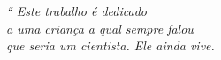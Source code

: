 \begin{epigrafe}
	\vspace*{\fill}
	\begin{flushright}
		\textit{``
		Este trabalho é dedicado 
		\\ a uma criança a qual sempre falou 
		\\ que seria um cientista. Ele ainda vive.}
	\end{flushright}
\end{epigrafe}
